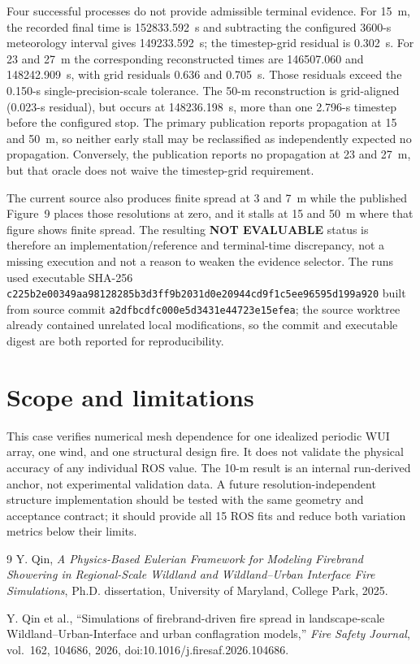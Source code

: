 Four successful processes do not provide admissible terminal evidence.  For
15~m, the recorded final time is 152833.592~s and subtracting the configured
3600-s meteorology interval gives 149233.592~s; the timestep-grid residual is
0.302~s.  For 23 and 27~m the corresponding reconstructed times are
146507.060 and 148242.909~s, with grid residuals 0.636 and 0.705~s.  Those
residuals exceed the 0.150-s single-precision-scale tolerance.  The 50-m
reconstruction is grid-aligned (0.023-s residual), but occurs at 148236.198~s,
more than one 2.796-s timestep before the configured stop.  The primary
publication reports propagation at 15 and 50~m, so neither early stall may be
reclassified as independently expected no propagation.  Conversely, the
publication reports no propagation at 23 and 27~m, but that oracle does not
waive the timestep-grid requirement.

The current source also produces finite spread at 3 and 7~m while the published
Figure~9 places those resolutions at zero, and it stalls at 15 and 50~m where
that figure shows finite spread.  The resulting \textbf{NOT EVALUABLE} status
is therefore an implementation/reference and terminal-time discrepancy, not a
missing execution and not a reason to weaken the evidence selector.  The runs
used executable SHA-256
\texttt{c225b2e0\allowbreak 0349aa98\allowbreak 128285b3\allowbreak d3ff9b20\allowbreak 31d0e209\allowbreak 44cd9f1c\allowbreak 5ee96595\allowbreak d199a920}
built from source commit
\texttt{a2dfbcdf\allowbreak c000e5d3\allowbreak 431e4472\allowbreak 3e15efea}; the source worktree already
contained unrelated local modifications, so the commit and executable digest
are both reported for reproducibility.

\section{Scope and limitations}
This case verifies numerical mesh dependence for one idealized periodic WUI
array, one wind, and one structural design fire. It does not validate the
physical accuracy of any individual ROS value. The 10-m result is an internal
run-derived anchor, not experimental validation data. A future
resolution-independent structure implementation should be tested with the same
geometry and acceptance contract; it should provide all 15 ROS fits and reduce
both variation metrics below their limits.

\begin{thebibliography}{9}
Y. Qin, \emph{A Physics-Based Eulerian Framework for Modeling Firebrand
Showering in Regional-Scale Wildland and Wildland--Urban Interface Fire
Simulations}, Ph.D. dissertation, University of Maryland, College Park, 2025.

Y. Qin et al., ``Simulations of firebrand-driven fire spread in
landscape-scale Wildland--Urban-Interface and urban conflagration models,''
\emph{Fire Safety Journal}, vol.~162, 104686, 2026,
doi:10.1016/j.firesaf.2026.104686.
\end{thebibliography}
